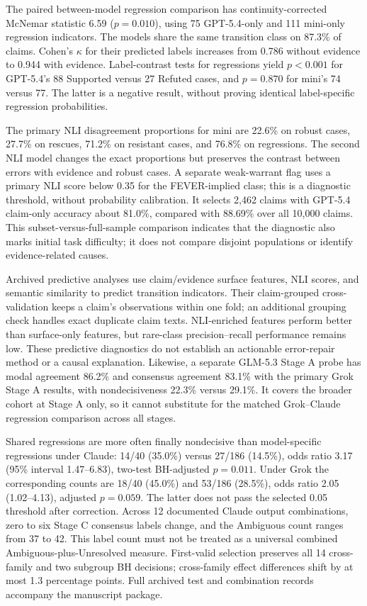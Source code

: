 \documentclass[11pt,letterpaper]{article}
\begin{document}
The paired between-model regression comparison has continuity-corrected McNemar statistic 6.59 ($p=0.010$), using 75 GPT-5.4-only and 111 mini-only regression indicators. The models share the same transition class on 87.3\% of claims. Cohen's $\kappa$ for their predicted labels increases from 0.786 without evidence to 0.944 with evidence. Label-contrast tests for regressions yield $p<0.001$ for GPT-5.4's 88 Supported versus 27 Refuted cases, and $p=0.870$ for mini's 74 versus 77. The latter is a negative result, without proving identical label-specific regression probabilities.

The primary NLI disagreement proportions for mini are 22.6\% on robust cases, 27.7\% on rescues, 71.2\% on resistant cases, and 76.8\% on regressions. The second NLI model changes the exact proportions but preserves the contrast between errors with evidence and robust cases. A separate weak-warrant flag uses a primary NLI score below 0.35 for the FEVER-implied class; this is a diagnostic threshold, without probability calibration. It selects 2,462 claims with GPT-5.4 claim-only accuracy about 81.0\%, compared with 88.69\% over all 10,000 claims. This subset-versus-full-sample comparison indicates that the diagnostic also marks initial task difficulty; it does not compare disjoint populations or identify evidence-related causes.

Archived predictive analyses use claim/evidence surface features, NLI scores, and semantic similarity to predict transition indicators. Their claim-grouped cross-validation keeps a claim's observations within one fold; an additional grouping check handles exact duplicate claim texts. NLI-enriched features perform better than surface-only features, but rare-class precision--recall performance remains low. These predictive diagnostics do not establish an actionable error-repair method or a causal explanation. Likewise, a separate GLM-5.3 Stage A probe has modal agreement 86.2\% and consensus agreement 83.1\% with the primary Grok Stage A results, with nondecisiveness 22.3\% versus 29.1\%. It covers the broader cohort at Stage A only, so it cannot substitute for the matched Grok--Claude regression comparison across all stages.

Shared regressions are more often finally nondecisive than model-specific regressions under Claude: 14/40 (35.0\%) versus 27/186 (14.5\%), odds ratio 3.17 (95\% interval 1.47--6.83), two-test BH-adjusted $p=0.011$. Under Grok the corresponding counts are 18/40 (45.0\%) and 53/186 (28.5\%), odds ratio 2.05 (1.02--4.13), adjusted $p=0.059$. The latter does not pass the selected 0.05 threshold after correction. Across 12 documented Claude output combinations, zero to six Stage C consensus labels change, and the Ambiguous count ranges from 37 to 42. This label count must not be treated as a universal combined Ambiguous-plus-Unresolved measure. First-valid selection preserves all 14 cross-family and two subgroup BH decisions; cross-family effect differences shift by at most 1.3 percentage points. Full archived test and combination records accompany the manuscript package.
\end{document}

